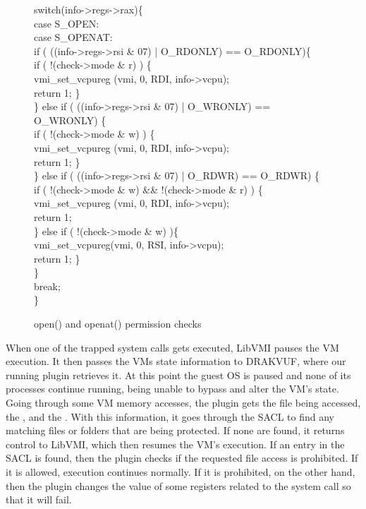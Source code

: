 \begin{figure}[ht!]
\footnotesize {
	{\selectfont 
switch(info->regs->rax)\{\\
\tab case S\_OPEN:\\
\tab case S\_OPENAT:\\
\tab if ( ((info->regs->rsi \& 07) | O\_RDONLY) == O\_RDONLY)\{\\
\tab \tab if ( !(check->mode \& r) ) \{\\
\tab \tab \tab vmi\_set\_vcpureg (vmi, 0, RDI, info->vcpu);\\
\tab \tab \tab return 1; \}\\
\tab \} else if ( ((info->regs->rsi \& 07) | O\_WRONLY) == O\_WRONLY) \{\\
\tab \tab if ( !(check->mode \& w) ) \{\\
\tab \tab \tab vmi\_set\_vcpureg (vmi, 0, RDI, info->vcpu);\\
\tab \tab \tab return 1; \}\\
\tab \} else if ( ((info->regs->rsi \& 07) | O\_RDWR) == O\_RDWR) \{\\
\tab \tab if ( !(check->mode \& w) \&\& !(check->mode \& r) ) \{\\
\tab \tab \tab vmi\_set\_vcpureg (vmi, 0, RDI, info->vcpu);\\
\tab \tab \tab return 1;\\
\tab \tab \} else if ( !(check->mode \& w) )\{\\
\tab \tab \tab vmi\_set\_vcpureg(vmi, 0, RSI, info->vcpu);\\
\tab \tab \tab return 1; \}\\
\tab \}\\
\tab break;\\
\}\\
}}
	\caption{open() and openat() permission checks}
	\label{fig:open}
\end{figure}

\par When one of the trapped system calls gets executed, LibVMI pauses the \ac{VM} execution. It then passes the \ac{VM}s state information to DRAKVUF, where our running plugin retrieves it. At this point the guest \ac{OS} is paused and none of its processes continue running, being unable to bypass and alter the \ac{VM}'s state. Going through some \ac{VM} memory accesses, the plugin gets the file being accessed, the , and the . With this information, it goes through the \ac{SACL} to find any matching files or folders that are being protected. If none are found, it returns control to LibVMI, which then resumes the \ac{VM}'s execution. If an entry in the \ac{SACL} is found, then the plugin checks if the requested file access is prohibited. If it is allowed, execution continues normally. If it is prohibited, on the other hand, then the plugin changes the value of some registers related to the system call so that it will fail.


